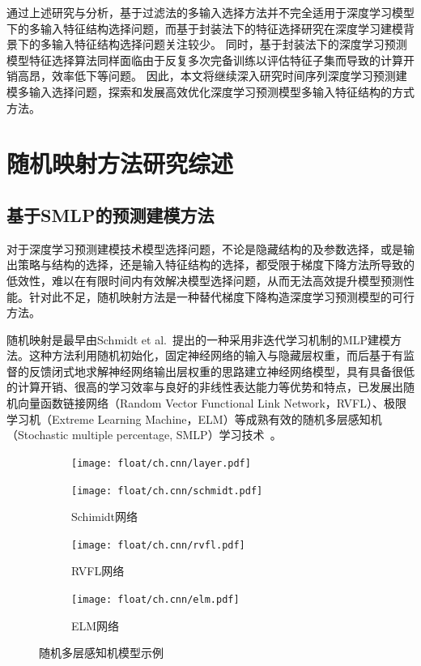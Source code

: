 通过上述研究与分析，基于过滤法的多输入选择方法并不完全适用于深度学习模型下的多输入特征结构选择问题，而基于封装法下的特征选择研究在深度学习建模背景下的多输入特征结构选择问题关注较少。
同时，基于封装法下的深度学习预测模型特征选择算法同样面临由于反复多次完备训练以评估特征子集而导致的计算开销高昂，效率低下等问题。
因此，本文将继续深入研究时间序列深度学习预测建模多输入选择问题，探索和发展高效优化深度学习预测模型多输入特征结构的方式方法。


\section{随机映射方法研究综述}
\subsection{基于SMLP的预测建模方法}


对于深度学习预测建模技术模型选择问题，不论是隐藏结构的及参数选择，或是输出策略与结构的选择，还是输入特征结构的选择，都受限于梯度下降方法所导致的低效性，难以在有限时间内有效解决模型选择问题，从而无法高效提升模型预测性能。针对此不足，随机映射方法是一种替代梯度下降构造深度学习预测模型的可行方法。

随机映射是最早由Schmidt et al.~\cite{schmidt1992feed}提出的一种采用非迭代学习机制的MLP建模方法。这种方法利用随机初始化，固定神经网络的输入与隐藏层权重，而后基于有监督的反馈闭式地求解神经网络输出层权重的思路建立神经网络模型，具有具备很低的计算开销、很高的学习效率与良好的非线性表达能力等优势和特点，已发展出随机向量函数链接网络（Random Vector Functional Link Network，RVFL）、极限学习机（Extreme Learning Machine，ELM）等成熟有效的随机多层感知机（Stochastic multiple percentage, SMLP）学习技术~\cite{scardapaneRandomness2017,caoReview2018,tanakaRecent2019}。

\begin{figure}[!t]
    \begin{subfigure}[b]{0.25\textwidth}
        \texttt{[image: float/ch.cnn/layer.pdf]}
        \caption*{}
    \end{subfigure}
    \hspace*{-0.15\textwidth}
    \begin{subfigure}[b]{0.25\textwidth}
        \texttt{[image: float/ch.cnn/schmidt.pdf]}
        \caption{Schimidt网络}
    \end{subfigure}
    \hspace*{0.03\textwidth}
    \begin{subfigure}[b]{0.25\textwidth}
        \texttt{[image: float/ch.cnn/rvfl.pdf]}
        \caption{RVFL网络}
    \end{subfigure}
    \hspace*{\fill}
    \begin{subfigure}[b]{0.25\textwidth}
        \texttt{[image: float/ch.cnn/elm.pdf]}
        \caption{ELM网络}
    \end{subfigure}
    \caption{\label{fig:randomnet}随机多层感知机模型示例}
\end{figure}

